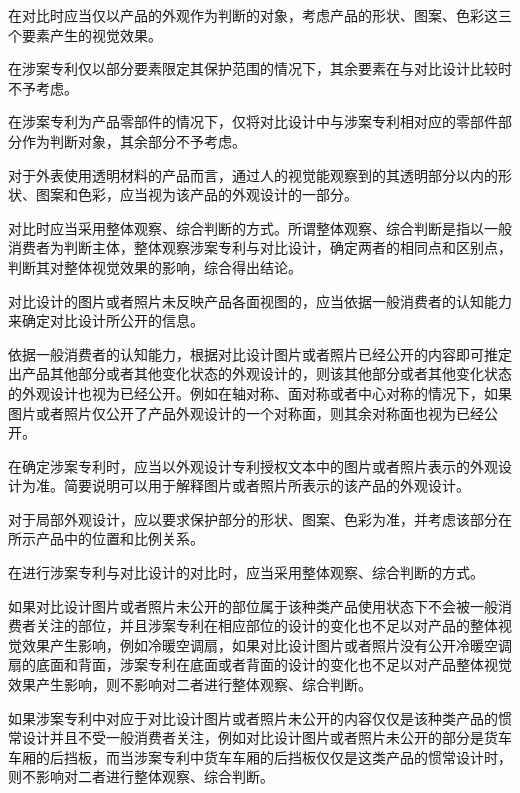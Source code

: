 在对比时应当仅以产品的外观作为判断的对象，考虑产品的形状、图案、色彩这三个要素产生的视觉效果。

在涉案专利仅以部分要素限定其保护范围的情况下，其余要素在与对比设计比较时不予考虑。

在涉案专利为产品零部件的情况下，仅将对比设计中与涉案专利相对应的零部件部分作为判断对象，其余部分不予考虑。

对于外表使用透明材料的产品而言，通过人的视觉能观察到的其透明部分以内的形状、图案和色彩，应当视为该产品的外观设计的一部分。

对比时应当采用整体观察、综合判断的方式。所谓整体观察、综合判断是指以一般消费者为判断主体，整体观察涉案专利与对比设计，确定两者的相同点和区别点，判断其对整体视觉效果的影响，综合得出结论。

对比设计的图片或者照片未反映产品各面视图的，应当依据一般消费者的认知能力来确定对比设计所公开的信息。

依据一般消费者的认知能力，根据对比设计图片或者照片已经公开的内容即可推定出产品其他部分或者其他变化状态的外观设计的，则该其他部分或者其他变化状态的外观设计也视为已经公开。例如在轴对称、面对称或者中心对称的情况下，如果图片或者照片仅公开了产品外观设计的一个对称面，则其余对称面也视为已经公开。

在确定涉案专利时，应当以外观设计专利授权文本中的图片或者照片表示的外观设计为准。简要说明可以用于解释图片或者照片所表示的该产品的外观设计。

对于局部外观设计，应以要求保护部分的形状、图案、色彩为准，并考虑该部分在所示产品中的位置和比例关系。

在进行涉案专利与对比设计的对比时，应当采用整体观察、综合判断的方式。

如果对比设计图片或者照片未公开的部位属于该种类产品使用状态下不会被一般消费者关注的部位，并且涉案专利在相应部位的设计的变化也不足以对产品的整体视觉效果产生影响，例如冷暖空调扇，如果对比设计图片或者照片没有公开冷暖空调扇的底面和背面，涉案专利在底面或者背面的设计的变化也不足以对产品整体视觉效果产生影响，则不影响对二者进行整体观察、综合判断。

如果涉案专利中对应于对比设计图片或者照片未公开的内容仅仅是该种类产品的惯常设计并且不受一般消费者关注，例如对比设计图片或者照片未公开的部分是货车车厢的后挡板，而当涉案专利中货车车厢的后挡板仅仅是这类产品的惯常设计时，则不影响对二者进行整体观察、综合判断。

